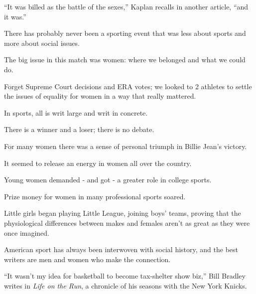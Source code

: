 \documentclass{book}
\numberwithin{equation}{section}
\begin{document}
``It was billed as the battle of the sexes,'' Kaplan recalls in another article, ``and it was.''

%
There has probably never been a sporting event that was less about sports and more about social issues.

The big issue in this match was women: where we belonged and what we could do.

Forget Supreme Court decisions and ERA votes; we looked to 2 athletes to settle the issues of equality for women in a way that really mattered.

In sports, all is writ large and writ in concrete.

There is a winner and a loser; there is no debate.

%
For many women there was a sense of personal triumph in Billie Jean's victory.

It seemed to release an energy in women all over the country.

Young women demanded - and got - a greater role in college sports.

Prize money for women in many professional sports soared.

Little girls began playing Little League, joining boys' teams, proving that the physiological differences between makes and females aren't as great as they were once imagined.

%
American sport has always been interwoven with social history, and the best writers are men and women who make the connection.

``It wasn't my idea for basketball to become tax-shelter show biz,'' Bill Bradley writes in \textit{Life on the Run}, a chronicle of his seasons with the New York Knicks.
\end{document}
